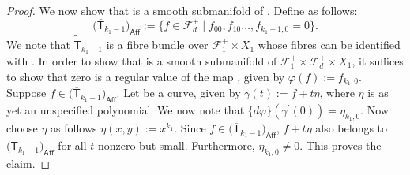 \begin{proof}
We now show that  is a smooth submanifold
of .
Define  as follows:
\[ \bigl(\overline{\mathsf{T}}_{k_1-1}\bigr)_{\mathsf{Aff}} :=
\bigl\{ f \in \mathcal{F}_d^{+}\mid f_{00}, f_{10} \dots, f_{k_1-1, 0} =0\bigr\}. \]
We note that
$\widetilde{\overline{\mathsf{T}}}_{k_1-1}$
is a fibre bundle over $\mathcal{F}_1^+\times X_1$
whose fibres can be identified with
.
In order to show that
 is a smooth submanifold of
$\mathcal{F}_1^+\times \mathcal{F}_d^+\times X_1$, it suffices to show that
zero is a regular value of the map
, given by
$\varphi(f):= f_{k_1, 0}$.
Suppose
$f \in \bigl(\overline{\mathsf{T}}_{k_1-1}\bigr)_{\mathsf{Aff}}$.
Let 
be a curve, given by
$\gamma(t):= f+t\eta$,
where $\eta$ is as yet an unspecified polynomial. We now note that
$\{d \varphi\}(\gamma^{\prime}(0)) = \eta_{k_1, 0}$. Now choose $\eta$ as follows
$\eta(x, y) := x^{k_1}$.
Since
$f \in \bigl(\overline{\mathsf{T}}_{k_1-1}\bigr)_{\mathsf{Aff}}$,
$f + t \eta$ also belongs to $\bigl(\overline{\mathsf{T}}_{k_1-1}\bigr)_{\mathsf{Aff}}$
for all $t$ nonzero but small.
Furthermore, $\eta_{k_1, 0} \neq 0$. This proves the claim.


\end{proof}

